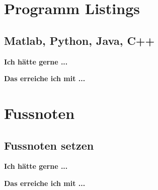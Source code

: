 \documentclass[twoside, 
               a4paper, 
               10pt, 
               parskip=full, 
               sectionentrydots=true, 
               listof=totoc, 
               listof=entryprefix,
               numbers=endperiod]{scrartcl}
\begin{document}
\newpage
\section{Programm Listings}
\subsection{Matlab, Python, Java, C++}

{\textbf {Ich hätte gerne ...}}
 
\begin{miniSeite}[colbacktitle=black!35!white,title=Ausdruck]

\end{miniSeite}


\newpage
{\textbf {Das erreiche ich mit ...}}
 
\begin{miniSeite}[colbacktitle=black!35!white,title=\LaTeX-Code]

\end{miniSeite}





\newpage
\section{Fussnoten}
\subsection{Fussnoten setzen}

{\textbf {Ich hätte gerne ...}}
 
\begin{miniSeite}[colbacktitle=black!35!white,title=Ausdruck]

\end{miniSeite}


\newpage
{\textbf {Das erreiche ich mit ...}}
 
\begin{miniSeite}[colbacktitle=black!35!white,title=\LaTeX-Code]

\end{miniSeite}




\end{document}
